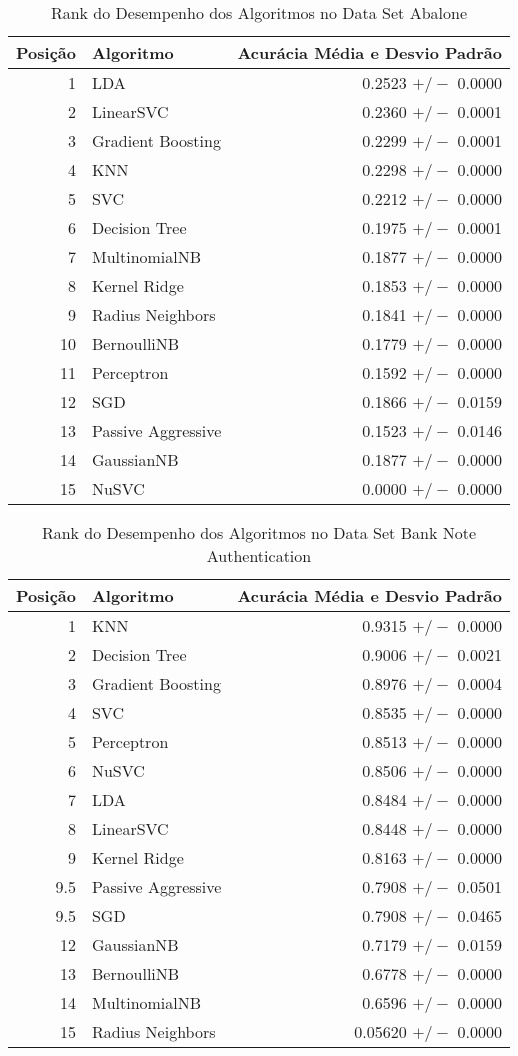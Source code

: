 \documentclass[11pt]{article}
\begin{document}
\label{RankAbalone}
\begin{table}[h]
\centering
\caption{Rank do Desempenho dos Algoritmos no Data Set Abalone}
\begin{tabular}{r|l|r}
Posição & Algoritmo & Acur{\'a}cia M{\'e}dia e Desvio Padr{\~a}o\\
\hline
1 & LDA & 0.2523 $+/-$ 0.0000 \\
2 & LinearSVC & 0.2360 $+/-$ 0.0001 \\
3 & Gradient Boosting & 0.2299 $+/-$ 0.0001 \\
4 & KNN & 0.2298 $+/-$ 0.0000 \\
5 & SVC & 0.2212 $+/-$ 0.0000 \\
6 & Decision Tree & 0.1975 $+/-$ 0.0001 \\
7 & MultinomialNB & 0.1877 $+/-$ 0.0000 \\
8 & Kernel Ridge & 0.1853 $+/-$ 0.0000 \\
9 & Radius Neighbors & 0.1841 $+/-$ 0.0000 \\
10 & BernoulliNB & 0.1779 $+/-$ 0.0000 \\
11 & Perceptron & 0.1592 $+/-$ 0.0000 \\
12 & SGD & 0.1866 $+/-$ 0.0159\\
13 & Passive Aggressive  & 0.1523 $+/-$ 0.0146\\
14 & GaussianNB & 0.1877 $+/-$ 0.0000 \\
15 & NuSVC & 0.0000 $+/-$ 0.0000 \\
\end{tabular}
\end{table}
\label{RankBank}
\begin{table}[p]
\caption{Rank do Desempenho dos Algoritmos no Data Set Bank Note Authentication}
\centering
\begin{tabular}{r|l|r}
Posição & Algoritmo & Acur{\'a}cia M{\'e}dia e Desvio Padr{\~a}o\\
\hline
1 & KNN & 0.9315 $+/-$ 0.0000 \\
2 & Decision Tree & 0.9006 $+/-$ 0.0021 \\
3 & Gradient Boosting & 0.8976 $+/-$ 0.0004 \\
4 & SVC & 0.8535 $+/-$ 0.0000 \\
5 & Perceptron & 0.8513 $+/-$ 0.0000 \\
6 & NuSVC & 0.8506 $+/-$ 0.0000 \\
7 & LDA & 0.8484 $+/-$ 0.0000 \\
8 & LinearSVC & 0.8448 $+/-$ 0.0000 \\
9 & Kernel Ridge & 0.8163 $+/-$ 0.0000 \\
9.5 & Passive Aggressive & 0.7908 $+/-$ 0.0501 \\
9.5 & SGD & 0.7908 $+/-$ 0.0465 \\
12 & GaussianNB & 0.7179 $+/-$ 0.0159\\
13 & BernoulliNB  & 0.6778 $+/-$ 0.0000\\
14 & MultinomialNB & 0.6596 $+/-$ 0.0000 \\
15 & Radius Neighbors & 0.05620 $+/-$ 0.0000 \\
\end{tabular}
\end{table}
\end{document}
